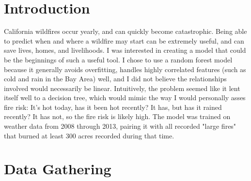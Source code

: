 \documentclass{article}
\begin{document}
\section*{Introduction} %

California wildfires occur yearly, and can quickly become catastrophic. Being able to predict when and where a wildfire may start can be extremely useful, and can save lives, homes, and livelihoods. I was interested in creating a model that could be the beginnings of such a useful tool. I chose to use a random forest model because it generally avoids overfitting, handles highly correlated features (such as cold and rain in the Bay Area) well, and I did not believe the relationships involved would necessarily be linear. Intuitively, the problem seemed like it lent itself well to a decision tree, which would mimic the way I would personally asses fire risk: It's hot today, has it been hot recently? It has, but has it rained recently? It has not, so the fire risk is likely high. The model was trained on weather data from 2008 through 2013, pairing it with all recorded "large fires" that burned at least 300 acres recorded during that time. 



\section{Data Gathering}
\end{document}
